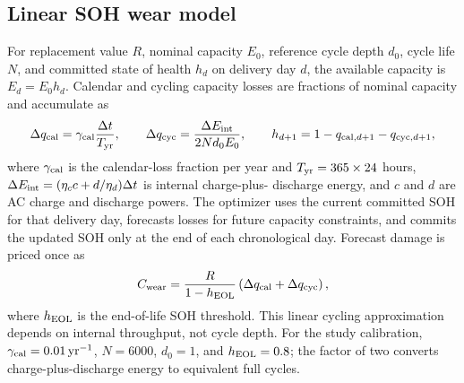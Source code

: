 \subsection{Linear SOH wear model}
For replacement value $R$, nominal capacity $E_0$, reference cycle depth $d_0$,
cycle life $N$, and committed state of health $h_d$ on delivery day $d$, the
available capacity is $E_d=E_0h_d$. Calendar and cycling capacity losses are
fractions of nominal capacity and accumulate as
\begin{equation}
\Delta q_{\rm cal}=\gamma_{\rm cal}\frac{\Delta t}{T_{\rm yr}},\qquad
\Delta q_{\rm cyc}=\frac{\Delta E_{\rm int}}
{2Nd_0E_0},\qquad
h_{d+1}=1-q_{{\rm cal},d+1}-q_{{\rm cyc},d+1},
\end{equation}
where $\gamma_{\rm cal}$ is the calendar-loss fraction per year and
$T_{\rm yr}=365\times24$ hours,
$\Delta E_{\rm int}=(\eta_c c+d/\eta_d)\Delta t$ is internal charge-plus-
discharge energy, and $c$ and $d$ are AC charge and discharge powers. The
optimizer uses the current committed SOH for that delivery day, forecasts
losses for future capacity constraints, and commits the updated SOH only at
the end of each chronological day. Forecast damage is priced once as
\begin{equation}
C_{\rm wear}=\frac{R}{1-h_{\rm EOL}}
\left(\Delta q_{\rm cal}+\Delta q_{\rm cyc}\right),
\end{equation}
where $h_{\rm EOL}$ is the end-of-life SOH threshold. This linear cycling
approximation depends on internal throughput, not cycle depth. For the study
calibration, $\gamma_{\rm cal}=0.01\,{\rm yr}^{-1}$, $N=6000$, $d_0=1$,
and $h_{\rm EOL}=0.8$; the factor of two converts charge-plus-discharge
energy to equivalent full cycles.

